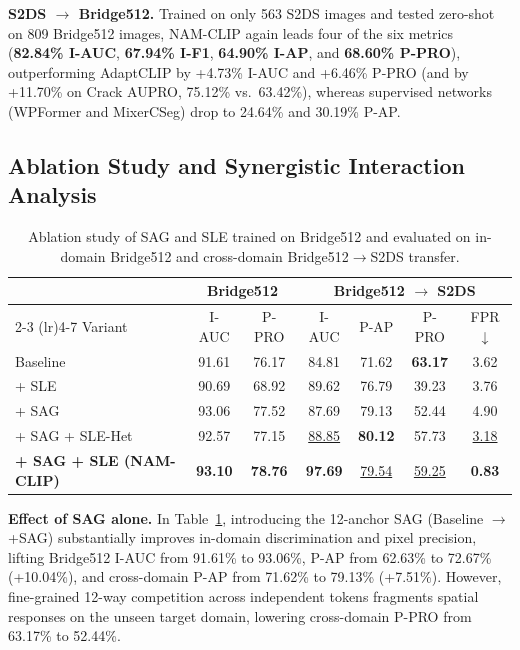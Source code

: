 \documentclass[conference]{IEEEtran}
\newcommand{\method}{NAM-CLIP}
\newcommand{\sag}{SAG}
\newcommand{\sle}{SLE}
\begin{document}
\textbf{S2DS $\rightarrow$ Bridge512.} Trained on only 563 S2DS images and tested zero-shot on 809 Bridge512 images, \method{} again leads four of the six metrics (\textbf{82.84\% I-AUC}, \textbf{67.94\% I-F1}, \textbf{64.90\% I-AP}, and \textbf{68.60\% P-PRO}), outperforming AdaptCLIP by +4.73\% I-AUC and +6.46\% P-PRO (and by +11.70\% on Crack AUPRO, 75.12\% vs.\ 63.42\%), whereas supervised networks (WPFormer and MixerCSeg) drop to 24.64\% and 30.19\% P-AP.

\subsection{Ablation Study and Synergistic Interaction Analysis}
\label{sec:ablation}

\begin{table}[t]
\centering
\caption{Ablation study of \sag{} and \sle{} trained on Bridge512 and evaluated on in-domain Bridge512 and cross-domain Bridge512$\rightarrow$S2DS transfer.}
\label{tab:ablation}
\footnotesize
\setlength{\tabcolsep}{2.0pt}
\begin{tabular}{l cc cccc}
\toprule
& \multicolumn{2}{c}{\textbf{Bridge512}} & \multicolumn{4}{c}{\textbf{Bridge512 $\rightarrow$ S2DS}} \\
\cmidrule(lr){2-3} \cmidrule(lr){4-7}
Variant & I-AUC & P-PRO & I-AUC & P-AP & P-PRO & FPR$\downarrow$ \\
\midrule
Baseline & 91.61 & 76.17 & 84.81 & 71.62 & \textbf{63.17} & 3.62 \\
+ \sle{} & 90.69 & 68.92 & 89.62 & 76.79 & 39.23 & 3.76 \\
+ \sag{} & 93.06 & 77.52 & 87.69 & 79.13 & 52.44 & 4.90 \\
+ \sag{} + \sle{}-Het & 92.57 & 77.15 & \underline{88.85} & \textbf{80.12} & 57.73 & \underline{3.18} \\
\textbf{+ \sag{} + \sle{} (\method{})} & \textbf{93.10} & \textbf{78.76} & \textbf{97.69} & \underline{79.54} & \underline{59.25} & \textbf{0.83} \\
\bottomrule
\end{tabular}
\end{table}

\textbf{Effect of \sag{} alone.} In Table~\ref{tab:ablation}, introducing the 12-anchor \sag{} (Baseline $\to$ +\sag{}) substantially improves in-domain discrimination and pixel precision, lifting Bridge512 I-AUC from 91.61\% to 93.06\%, P-AP from 62.63\% to 72.67\% (+10.04\%), and cross-domain P-AP from 71.62\% to 79.13\% (+7.51\%). However, fine-grained 12-way competition across independent tokens fragments spatial responses on the unseen target domain, lowering cross-domain P-PRO from 63.17\% to 52.44\%.
\end{document}
